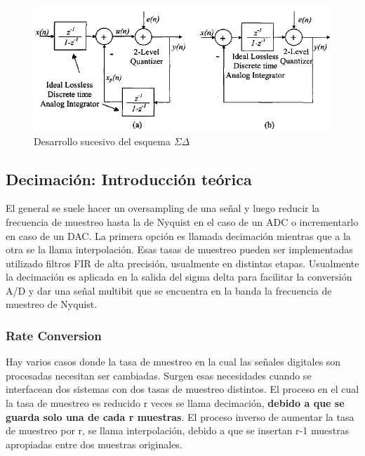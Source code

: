 \documentclass[assd_tp3_main.tex]{subfiles}
\begin{document}
\begin{figure}[H]
\centering
\includegraphics[width=0.6\linewidth]{images/ej4/sd_block_model.png}
\caption{Desarrollo sucesivo del esquema $\Sigma\Delta$ }
\label{fig:sd_block_model}
\end{figure}

\subsection{Decimación: Introducción teórica}
El general se suele hacer un oversampling de una señal y luego reducir la frecuencia de muestreo hasta la de Nyquist en el caso de un ADC o incrementarlo en caso de un DAC. La primera opción es llamada decimación mientras que a la otra se la llama interpolación.
Esas tasas de muestreo pueden ser implementadas utilizado filtros FIR de alta precisión, usualmente en distintas etapas.
Usualmente la decimación es aplicada en la salida del sigma delta para facilitar la conversión A/D y dar una señal multibit que se encuentra en la banda la frecuencia de muestreo de Nyquist.
\subsubsection{Rate Conversion}
Hay varios casos donde la tasa de muestreo en la cual las señales digitales son procesadas necesitan ser cambiadas. Surgen esas necesidades cuando se interfacean dos sistemas con dos tasas de muestreo distintos. El proceso en el cual  la tasa de muestreo es reducido r veces se llama decimación, \textbf{debido a que se guarda solo una de cada r muestras}.
El proceso inverso de aumentar la tasa de muestreo por r, se llama interpolación, debido a que se insertan r-1 muestras apropiadas entre dos muestras originales.
\end{document}
